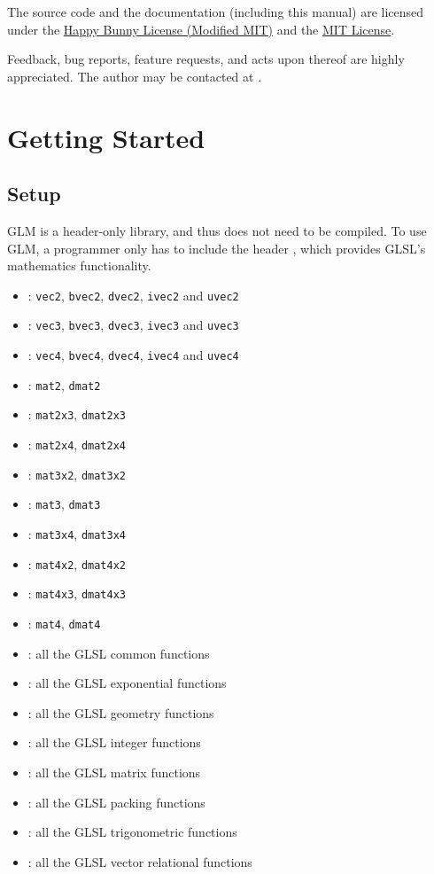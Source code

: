 \documentclass{scrartcl}
\numberwithin{figure}{subsection}
\begin{document}
The source code and the documentation (including this manual) are licensed under the \hyperlink{happybunny}{Happy Bunny License (Modified MIT)} and the \hyperlink{mit}{MIT License}.

Feedback, bug reports, feature requests, and acts upon thereof are highly appreciated.  The author may be contacted at .


\section{Getting Started}
\subsection{Setup}

GLM is a header-only library, and thus does not need to be compiled.  To use GLM, a programmer only has to include the header , which provides GLSL's mathematics functionality.

\begin{itemize}
  \item {}: \verb|vec2|, \verb|bvec2|, \verb|dvec2|, \verb|ivec2| and \verb|uvec2|
  \item {}: \verb|vec3|, \verb|bvec3|, \verb|dvec3|, \verb|ivec3| and \verb|uvec3|
  \item {}: \verb|vec4|, \verb|bvec4|, \verb|dvec4|, \verb|ivec4| and \verb|uvec4|
  \item {}: \verb|mat2|, \verb|dmat2|
  \item {}: \verb|mat2x3|, \verb|dmat2x3|
  \item {}: \verb|mat2x4|, \verb|dmat2x4|
  \item {}: \verb|mat3x2|, \verb|dmat3x2|
  \item {}: \verb|mat3|, \verb|dmat3|
  \item {}: \verb|mat3x4|, \verb|dmat3x4|
  \item {}: \verb|mat4x2|, \verb|dmat4x2|
  \item {}: \verb|mat4x3|, \verb|dmat4x3|
  \item {}: \verb|mat4|, \verb|dmat4|
  \item {}: all the GLSL common functions
  \item {}: all the GLSL exponential functions
  \item {}: all the GLSL geometry functions
  \item {}: all the GLSL integer functions
  \item {}: all the GLSL matrix functions
  \item {}: all the GLSL packing functions
  \item {}: all the GLSL trigonometric functions
  \item {}: all the GLSL vector relational functions
\end{itemize}
\end{document}

